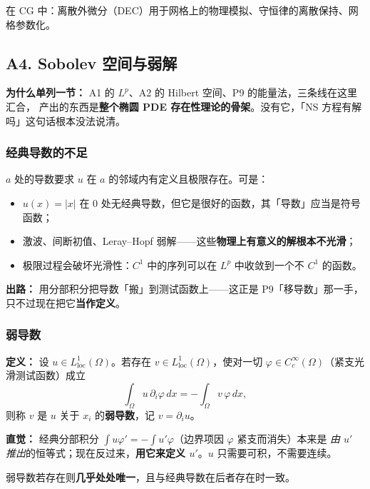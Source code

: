 在 CG 中：离散外微分（DEC）用于网格上的物理模拟、守恒律的离散保持、网格参数化。

\subsection{A4. Sobolev 空间与弱解}
\label{subsec:sobolev}

\textbf{为什么单列一节：} A1 的 $L^p$、A2 的 Hilbert 空间、P9 的能量法，三条线在这里汇合，
产出的东西是\textbf{整个椭圆 PDE 存在性理论的骨架}。没有它，「NS 方程有解吗」这句话根本没法说清。

\subsubsection{经典导数的不足}

$a$ 处的导数要求 $u$ 在 $a$ 的邻域内有定义且极限存在。可是：

\begin{itemize}
  \item $u(x)=|x|$ 在 $0$ 处无经典导数，但它是很好的函数，其「导数」应当是符号函数；
  \item 激波、间断初值、Leray--Hopf 弱解——这些\textbf{物理上有意义的解根本不光滑}；
  \item 极限过程会破坏光滑性：$C^1$ 中的序列可以在 $L^p$ 中收敛到一个不 $C^1$ 的函数。
\end{itemize}

\textbf{出路：} 用分部积分把导数「搬」到测试函数上——这正是 P9「移导数」那一手，
只不过现在把它\textbf{当作定义}。

\subsubsection{弱导数}

\textbf{定义：} 设 $u\in L^1_{\text{loc}}(\Omega)$。若存在 $v\in L^1_{\text{loc}}(\Omega)$，使对一切
$\varphi\in C_c^\infty(\Omega)$（紧支光滑测试函数）成立
\[
\int_\Omega u\,\partial_i\varphi\,dx=-\int_\Omega v\,\varphi\,dx,
\]
则称 $v$ 是 $u$ 关于 $x_i$ 的\textbf{弱导数}，记 $v=\partial_i u$。

\textbf{直觉：} 经典分部积分 $\int u\varphi'=-\int u'\varphi$（边界项因 $\varphi$ 紧支而消失）本来是
\emph{由 $u'$ 推出}的恒等式；现在反过来，\textbf{用它来定义 $u'$}。$u$ 只需要可积，不需要连续。

弱导数若存在则\textbf{几乎处处唯一}，且与经典导数在后者存在时一致。

